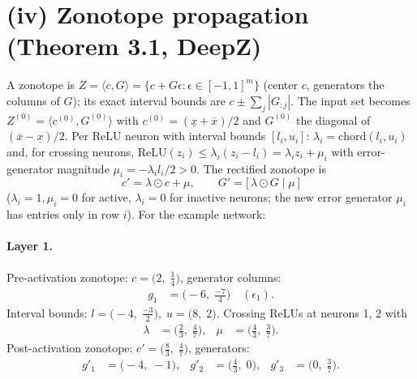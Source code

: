 \documentclass[11pt]{article}
\begin{document}
\section{(iv) Zonotope propagation (Theorem 3.1, DeepZ)}
A zonotope is $Z = \langle c, G \rangle = \{c + G\epsilon : \epsilon \in [-1,1]^m\}$
(center $c$, generators the columns of $G$); its exact interval bounds are
$c \pm \sum_j |G_{:j}|$. The input set becomes $Z^{(0)} = \langle c^{(0)}, G^{(0)} \rangle$ with
$c^{(0)} = (\underline{x} + \overline{x})/2$ and $G^{(0)}$ the diagonal of $(\overline{x} - \underline{x})/2$.
Per ReLU neuron with interval bounds $[l_i, u_i]$:
$\lambda_i = \mathrm{chord}(l_i, u_i)$ and, for crossing neurons,
$\mathrm{ReLU}(z_i) \le \lambda_i (z_i - l_i) = \lambda_i z_i + \mu_i$ with error-generator magnitude
$\mu_i = -\lambda_i l_i / 2 > 0$. The rectified zonotope is
\begin{equation*}
c' = \lambda \odot c + \mu, \qquad G' = \bigl[\, \lambda \odot G \;\big|\; \mu\, \bigr]
\end{equation*}
($\lambda_i = 1, \mu_i = 0$ for active, $\lambda_i = 0$ for inactive neurons;
the new error generator $\mu_i$ has entries only in row $i$).
For the example network:
\paragraph{Layer 1.}
Pre-activation zonotope: $c = \bigl(2,\; \frac{1}{4}\bigr)$, generator columns:
\begin{align*}
g_{1} &= \bigl(-6,\; \frac{-7}{4}\bigr) \quad (\epsilon_{1}).
\end{align*}
Interval bounds: $l = \bigl(-4,\; \frac{-3}{2}\bigr), \; u = \bigl(8,\; 2\bigr)$. 
Crossing ReLUs at neurons 1, 2 with
\begin{align*}
\lambda &= \bigl(\frac{2}{3},\; \frac{4}{7}\bigr), & \mu &= \bigl(\frac{4}{3},\; \frac{3}{7}\bigr).
\end{align*}
Post-activation zonotope: $c' = \bigl(\frac{8}{3},\; \frac{4}{7}\bigr)$, generators:
\begin{align*}
g'_{1} &= \bigl(-4,\; -1\bigr), &
g'_{2} &= \bigl(\frac{4}{3},\; 0\bigr), &
g'_{3} &= \bigl(0,\; \frac{3}{7}\bigr).
\end{align*}
\end{document}
